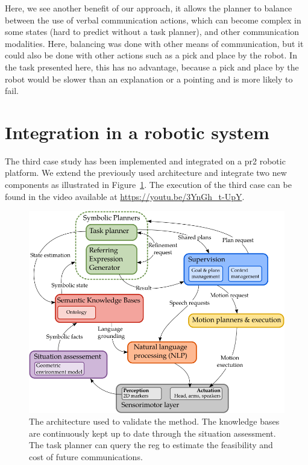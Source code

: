 Here, we see another benefit of our approach, it allows the planner to balance between the use of verbal communication actions, which can become complex in some states (hard to predict without a task planner), and other communication modalities. Here, balancing was done with other means of communication, but it could also be done with other actions such as a pick and place by the robot. In the task presented here, this has no advantage, because a pick and place by the robot would be slower than an explanation or a pointing and is more likely to fail.

\section{Integration in a robotic system}

The third case study has been implemented and integrated on a pr2 robotic platform. We extend the previously used architecture and integrate two new components as illustrated in Figure~\ref{fig:chap5_archi}. The execution of the third case can be found in the video available at \url{https://youtu.be/3YnGh_t-UpY}.

\begin{figure}[!ht]
\centering
\includegraphics[scale=0.6]{figures/chapter5/architecture.png}
\caption{\label{fig:chap5_archi} The architecture used to validate the method. The knowledge bases are continuously kept up to date through the situation assessment. The task planner can query the \acrshort{reg} to estimate the feasibility and cost of future communications. }
\end{figure}


